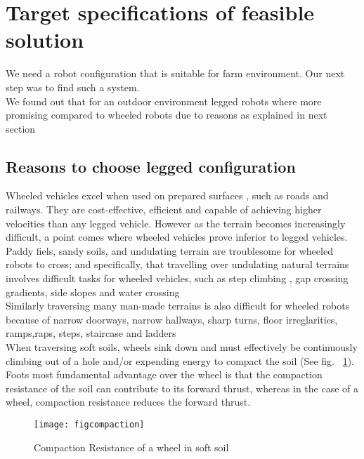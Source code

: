 \documentclass{report}
\begin{document}
\section{Target specifications of feasible solution}
We need a robot configuration that is suitable for farm environment. Our next step was to find such a system.\\
We found out that for an outdoor environment legged robots where more promising compared to wheeled robots due to  reasons as explained in next section
\subsection{Reasons to choose legged configuration}
Wheeled vehicles excel when used on prepared surfaces , such as roads and railways. They are cost-effective, efficient and capable of achieving higher velocities than any legged vehicle. However as the terrain becomes increasingly difficult, a point comes where wheeled vehicles prove inferior to legged vehicles.\\
Paddy fiels, sandy soils, and undulating terrain are troublesome for wheeled robots to cross; and specifically, that travelling over undulating natural terrains involves difficult tasks for wheeled vehicles, such as step climbing , gap crossing gradients, side slopes and water crossing\\
Similarly traversing many man-made terrains is also difficult for wheeled robots  because of narrow doorways, narrow hallways, sharp turns, floor irreglarities, ramps,raps, steps, staircase and ladders\\
When traversing soft soils, wheels sink down and must effectively be continuously climbing out of a hole and/or expending energy to compact the soil (See fig. ~\ref{fig1}). Foots most fundamental advantage over the wheel is that the compaction resistance of the soil can contribute to its forward thrust, whereas in the case of a wheel, compaction resistance reduces the forward thrust.
\begin{figure}[h!]
\centering
\texttt{[image: figcompaction]}
\caption{Compaction Resistance of a wheel in soft soil}
\label{fig1}
\end{figure}
\end{document}
